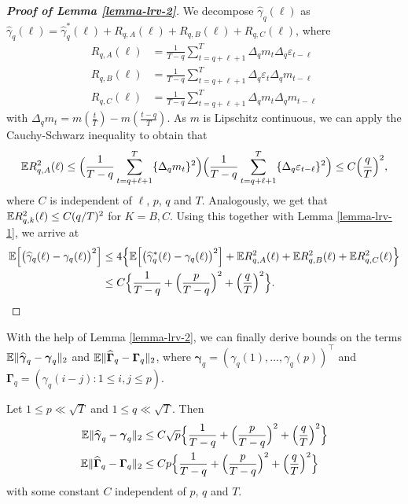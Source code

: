 \begin{proof}[\textnormal{\textbf{Proof of Lemma \ref{lemma-lrv-2}}}] 
We decompose $\widehat{\gamma}_q(\ell)$ as $\widehat{\gamma}_q(\ell) = \widehat{\gamma}_q^*(\ell) + R_{q,A}(\ell) + R_{q,B}(\ell) + R_{q,C}(\ell)$, where 
\begin{align*} 
R_{q,A}(\ell) & = \frac{1}{T-q} \sum_{t=q+\ell+1}^T \Delta_q m_t \Delta_q \varepsilon_{t-\ell} \\
R_{q,B}(\ell) & = \frac{1}{T-q} \sum_{t=q+\ell+1}^T \Delta_q \varepsilon_t \Delta_q m_{t-\ell} \\
R_{q,C}(\ell) & = \frac{1}{T-q} \sum_{t=q+\ell+1}^T \Delta_q m_t \Delta_q m_{t-\ell} 
\end{align*}
with $\Delta_q m_t = m(\frac{t}{T}) - m(\frac{t-q}{T})$. 
As $m$ is Lipschitz continuous, we can apply the Cauchy-Schwarz inequality to obtain that 
\[ \mathbb{E} R_{q,A}^2(\ell) \le  \Big( \frac{1}{T-q} \sum_{t=q+\ell+1}^T \{ \Delta_q m_t \}^2 \Big) \Big( \frac{1}{T-q} \sum_{t=q+\ell+1}^T \{ \Delta_q \varepsilon_{t-\ell} \}^2 \Big) \le C \Big( \frac{q}{T} \Big)^2, \]
where $C$ is independent of $\ell$, $p$, $q$ and $T$. Analogously, we get that $\mathbb{E} R_{q,k}^2(\ell) \le C (q/T)^2$ for $K = B,C$. Using this together with Lemma \ref{lemma-lrv-1}, we arrive at 
\begin{align*}
\mathbb{E} \Big[ \big( \widehat{\gamma}_q(\ell) - \gamma_q(\ell) \big)^2 \Big] 
 & \le 4 \Big\{ \mathbb{E} \Big[ \big( \widehat{\gamma}_q^*(\ell) - \gamma_q(\ell) \big)^2 \Big] + \mathbb{E} R_{q,A}^2(\ell) + \mathbb{E} R_{q,B}^2(\ell) + \mathbb{E} R_{q,C}^2(\ell) \Big\} \\
 & \le C \Big\{ \frac{1}{T-q} + \Big(\frac{p}{T-q}\Big)^2 + \Big(\frac{q}{T}\Big)^2 \Big\}. \qedhere
\end{align*}
\end{proof}


With the help of Lemma \ref{lemma-lrv-2}, we can finally derive bounds on the terms $\mathbb{E} \| \widehat{\boldsymbol{\gamma}}_q - \boldsymbol{\gamma}_q \|_2$ and $\mathbb{E} \| \widehat{\boldsymbol{\Gamma}}_q - \boldsymbol{\Gamma}_q \|_2$, where $\boldsymbol{\gamma}_q = (\gamma_q(1),\dots,\gamma_q(p))^\top$ and $\boldsymbol{\Gamma}_q = (\gamma_q(i-j): 1 \le i,j \le p)$. 
\begin{lemmaA}\label{lemma-lrv-3}
Let $1 \le p \ll \sqrt{T}$ and $1 \le q \ll \sqrt{T}$. Then 
\begin{align*}
\mathbb{E} \| \widehat{\boldsymbol{\gamma}}_q - \boldsymbol{\gamma}_q \|_2 & \le C \sqrt{p} \Big\{ \frac{1}{T-q} + \Big(\frac{p}{T-q}\Big)^2 + \Big(\frac{q}{T}\Big)^2 \Big\} \\
\mathbb{E} \| \widehat{\boldsymbol{\Gamma}}_q - \boldsymbol{\Gamma}_q \|_2 & \le C p \Big\{ \frac{1}{T-q} + \Big(\frac{p}{T-q}\Big)^2 + \Big(\frac{q}{T}\Big)^2 \Big\}
\end{align*}
with some constant $C$ independent of $p$, $q$ and $T$. 
\end{lemmaA}


